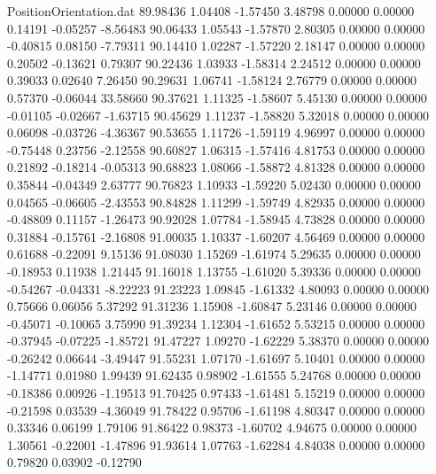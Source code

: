 \begin{filecontents}{PositionOrientation.dat}
  89.98436    1.04408   -1.57450     3.48798    0.00000    0.00000    0.14191   -0.05257   -8.56483
  90.06433    1.05543   -1.57870     2.80305    0.00000    0.00000   -0.40815    0.08150   -7.79311
  90.14410    1.02287   -1.57220     2.18147    0.00000    0.00000    0.20502   -0.13621    0.79307
  90.22436    1.03933   -1.58314     2.24512    0.00000    0.00000    0.39033    0.02640    7.26450
  90.29631    1.06741   -1.58124     2.76779    0.00000    0.00000    0.57370   -0.06044   33.58660
  90.37621    1.11325   -1.58607     5.45130    0.00000    0.00000   -0.01105   -0.02667   -1.63715
  90.45629    1.11237   -1.58820     5.32018    0.00000    0.00000    0.06098   -0.03726   -4.36367
  90.53655    1.11726   -1.59119     4.96997    0.00000    0.00000   -0.75448    0.23756   -2.12558
  90.60827    1.06315   -1.57416     4.81753    0.00000    0.00000    0.21892   -0.18214   -0.05313
  90.68823    1.08066   -1.58872     4.81328    0.00000    0.00000    0.35844   -0.04349    2.63777
  90.76823    1.10933   -1.59220     5.02430    0.00000    0.00000    0.04565   -0.06605   -2.43553
  90.84828    1.11299   -1.59749     4.82935    0.00000    0.00000   -0.48809    0.11157   -1.26473
  90.92028    1.07784   -1.58945     4.73828    0.00000    0.00000    0.31884   -0.15761   -2.16808
  91.00035    1.10337   -1.60207     4.56469    0.00000    0.00000    0.61688   -0.22091    9.15136
  91.08030    1.15269   -1.61974     5.29635    0.00000    0.00000   -0.18953    0.11938    1.21445
  91.16018    1.13755   -1.61020     5.39336    0.00000    0.00000   -0.54267   -0.04331   -8.22223
  91.23223    1.09845   -1.61332     4.80093    0.00000    0.00000    0.75666    0.06056    5.37292
  91.31236    1.15908   -1.60847     5.23146    0.00000    0.00000   -0.45071   -0.10065    3.75990
  91.39234    1.12304   -1.61652     5.53215    0.00000    0.00000   -0.37945   -0.07225   -1.85721
  91.47227    1.09270   -1.62229     5.38370    0.00000    0.00000   -0.26242    0.06644   -3.49447
  91.55231    1.07170   -1.61697     5.10401    0.00000    0.00000   -1.14771    0.01980    1.99439
  91.62435    0.98902   -1.61555     5.24768    0.00000    0.00000   -0.18386    0.00926   -1.19513
  91.70425    0.97433   -1.61481     5.15219    0.00000    0.00000   -0.21598    0.03539   -4.36049
  91.78422    0.95706   -1.61198     4.80347    0.00000    0.00000    0.33346    0.06199    1.79106
  91.86422    0.98373   -1.60702     4.94675    0.00000    0.00000    1.30561   -0.22001   -1.47896
  91.93614    1.07763   -1.62284     4.84038    0.00000    0.00000    0.79820    0.03902   -0.12790

\end{filecontents}
